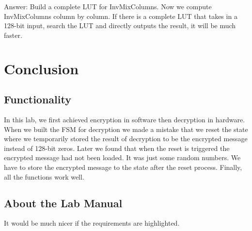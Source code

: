 \documentclass[12pt]{article}
\begin{document}
Answer: Build a complete LUT for InvMixColumns. Now we compute InvMixColumns column by column. If there is a complete LUT that takes in a 128-bit input, search the LUT and directly outputs the result, it will be much faster. \\

\section{Conclusion}
\subsection{Functionality}
In this lab, we first achieved encryption in software then decryption in hardware. When we built the FSM for decryption we made a mistake that we reset the state where we temporarily stored the result of decryption to be the encrypted message instead of 128-bit zeros. Later we found that when the reset is triggered the encrypted message had not been loaded. It was just some random numbers. We have to store the encrypted message to the state after the reset process. Finally, all the functions work well.

\subsection{About the Lab Manual}
It would be much nicer if the requirements are highlighted.

\newpage


\end{document}
